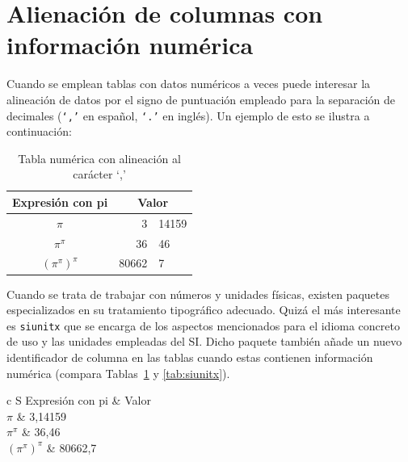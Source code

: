 \documentclass[ 		%
	11pt,				%
	a4paper,			%
	twoside,			%
	openright,			%
	final       		%
]{book}
\begin{document}
\section{Alienación de columnas con información numérica}
Cuando se emplean tablas con datos numéricos a veces puede interesar la alineación de datos por el signo de puntuación empleado para la separación de decimales (\texttt{`,'} en español, \texttt{`.'} en inglés). Un ejemplo de esto se ilustra a continuación:

\begin{table}[H]%
	\centering
	\caption{Tabla numérica con alineación al carácter `,'}
	\label{tab:alineada}
	\begin{tabular}{c r@{,} l}
    \toprule
	Expresión con pi & \multicolumn{2}{c}{Valor} \\
	\midrule
	$\pi$                   &      3 & 14159 \\
	$\pi^{\pi}$             & 36     &    46 \\
	$(\pi^{\pi})^{\pi}$     &  80662 & 7     \\
    \bottomrule
	\end{tabular}
\end{table}

Cuando se trata de trabajar con números y unidades físicas, existen paquetes especializados en su tratamiento tipográfico adecuado. Quizá el más interesante es \texttt{siunitx} que se encarga de los aspectos mencionados para el idioma concreto de uso y las unidades empleadas del SI. Dicho paquete también añade un nuevo identificador de columna en las tablas cuando estas contienen información numérica (compara Tablas~\ref{tab:alineada} y \ref{tab:siunitx}).

\begin{table}[H]%
	\centering
	\caption{Tabla numérica con alineación al carácter `,' obtenido mediante paquete \texttt{siunitx}}
	\label{tab:siunitx}
	\begin{tabular}{c S}
    \toprule
	Expresión con pi & Valor \\
	\midrule
	$\pi$                   & 3,14159 \\
	$\pi^{\pi}$             & 36,46 \\
	$(\pi^{\pi})^{\pi}$     & 80662,7 \\
    \bottomrule
	\end{tabular}
\end{table}
\end{document}
